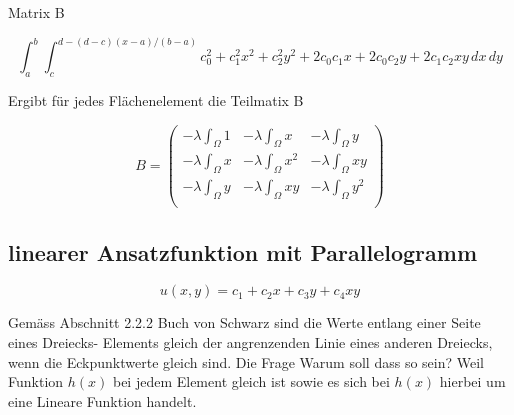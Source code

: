 Matrix B 

\begin{equation}
			\int_a^b \int_c^{d-(d-c)(x-a)/(b-a)} c_0^2 + c_1^2 x^2 + c_2^2 y^2 + 2 c_0 c_1 x + 2 c_0 c_2 y + 2 c_1 c_2 xy \, dx \, dy
			\label{fem:Minimal2LinAlgB}
\end{equation}

Ergibt für jedes Flächenelement die Teilmatix B

\begin{equation}
 B = \left( \begin{array}{ccc}
	- \lambda \int_{\Omega} 1 &  - \lambda \int_{\Omega} x & - \lambda \int_{\Omega} y  \\
	- \lambda \int_{\Omega} x & - \lambda \int_{\Omega} x^2 &  - \lambda \int_{\Omega} xy \\
	- \lambda \int_{\Omega} y & - \lambda \int_{\Omega} xy &  - \lambda \int_{\Omega} y^2 \\
	\end{array}\right)
	\label{fem:MatrixB}
\end{equation}


\subsection{linearer Ansatzfunktion mit Parallelogramm
\label{fem:subsection:lineParallel}}

\begin{equation}
	u(x,y) = c_1 + c_2 x + c_3 y + c_4 xy
\end{equation} 





Gemäss Abschnitt 2.2.2 Buch von Schwarz sind die Werte entlang einer Seite eines Dreiecks- Elements gleich  der angrenzenden Linie eines anderen Dreiecks, wenn die Eckpunktwerte gleich sind. Die Frage Warum soll dass so sein? Weil Funktion $h(x)$ bei jedem Element gleich ist sowie es sich bei $h(x)$ hierbei um eine Lineare Funktion handelt.

